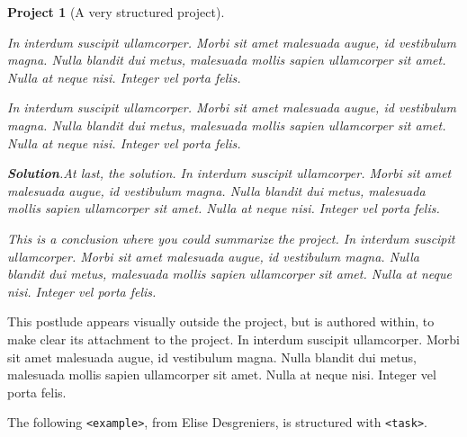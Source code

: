 \documentclass{sn-jnl}
\theoremstyle{thmstyleone}%
\theoremstyle{thmstyletwo}%
\newtheorem{project}[theorem]{Project}
\theoremstyle{thmstylethree}%
\newcommand{\blocktitlefont}{\relax}
\newcommand{\mono}[1]{\texttt{#1}}
\numberwithin{equation}{section}
\begin{document}
\begin{project}[A very structured project]
\begin{enumerate}[font=\bfseries,label=(\alph*),ref=\alph*]
\par
In interdum suscipit ullamcorper. Morbi sit amet malesuada augue, id vestibulum magna. Nulla blandit dui metus, malesuada mollis sapien ullamcorper sit amet. Nulla at neque nisi. Integer vel porta felis.%
\par
In interdum suscipit ullamcorper. Morbi sit amet malesuada augue, id vestibulum magna. Nulla blandit dui metus, malesuada mollis sapien ullamcorper sit amet. Nulla at neque nisi. Integer vel porta felis.%
\par\smallskip%
\noindent\textbf{\blocktitlefont Solution}.\hypertarget{project-structured-7-5}{}\quad{}At last, the solution.  In interdum suscipit ullamcorper. Morbi sit amet malesuada augue, id vestibulum magna. Nulla blandit dui metus, malesuada mollis sapien ullamcorper sit amet. Nulla at neque nisi. Integer vel porta felis.%
\end{enumerate}%
This is a conclusion where you could summarize the project.  In interdum suscipit ullamcorper. Morbi sit amet malesuada augue, id vestibulum magna. Nulla blandit dui metus, malesuada mollis sapien ullamcorper sit amet. Nulla at neque nisi. Integer vel porta felis.%
\end{project}%
\par
This postlude appears visually outside the project, but is authored within, to make clear its attachment to the project.  In interdum suscipit ullamcorper. Morbi sit amet malesuada augue, id vestibulum magna. Nulla blandit dui metus, malesuada mollis sapien ullamcorper sit amet. Nulla at neque nisi. Integer vel porta felis.%
\par
The following \mono{<example>}, from Elise Desgreniers, is structured with \mono{<task>}.%
\end{document}
